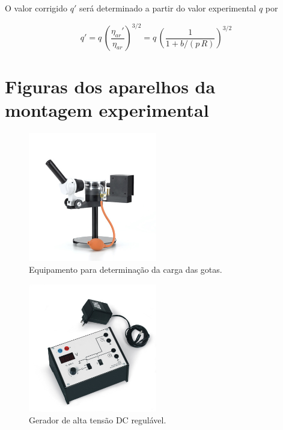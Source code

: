 \documentclass[12pt,a4paper,oneside]{paper}
\begin{document}
O valor corrigido $q'$ será  determinado a partir do valor experimental $q$ por

\begin{equation}
	\label{eq:correcao1}
	q' = q\, \left(\frac{\eta_{ar}'}{\eta_{ar}}\right)^{3/2}  =q\, \left(\frac{1}{1 + b/(p\,R)}\right)^{3/2}  
\end{equation}

\section{\sf Figuras dos aparelhos da montagem experimental}
\begin{figure}[H]
	[htb]  \centering 
	\includegraphics[width=0.5\textwidth]{./milikan_images/U131001_01_Aparelho-de-Millikan.jpg}
	\caption{Equipamento para determinação da carga das gotas. \label{fig:Equi}} 
\end{figure}

\begin{figure}[H]
	[htb]  \centering 
	\includegraphics[width=0.5\textwidth]{./milikan_images/U13105-230_01_Aparelho-operacional-de-Millikan.jpg}
	\caption{Gerador de alta tensão DC regulável. \label{fig:fonteDC_HT}} 
\end{figure}
\end{document}
